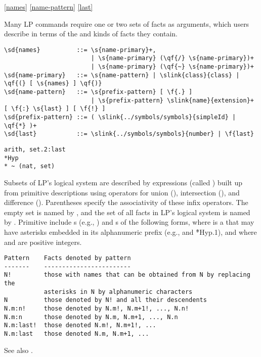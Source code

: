 \ref{names}
\ref{name-pattern}
\ref{last}

Many LP commands require one or two sets of facts as arguments, which users
describe in terms of the  and kinds of facts they contain.

\begin{verbatim}
\sd{names}          ::= \s{name-primary}+,
                        | \s{name-primary} (\qf{/} \s{name-primary})+
                        | \s{name-primary} (\qf{~} \s{name-primary})+
\sd{name-primary}   ::= \s{name-pattern} | \slink{class}{class} | \qf{(} [ \s{names} ] \qf{)}
\sd{name-pattern}   ::= \s{prefix-pattern} [ \f{.} ] 
                        | \s{prefix-pattern} \slink{name}{extension}+ [ \f{:} \s{last} ] [ \f{!} ]
\sd{prefix-pattern} ::= ( \slink{../symbols/symbols}{simpleId} | \qf{*} )+
\sd{last}           ::= \slink{../symbols/symbols}{number} | \f{last}

\end{verbatim}

\begin{verbatim}
arith, set.2:last
*Hyp
* ~ (nat, set)
\end{verbatim}

Subsets of LP's logical system are described by expressions (called )
built up from primitive descriptions using operators for union (\qf{,}),
intersection (\qf{/}), and difference (\qf{~}).  Parentheses specify the
associativity of these infix operators.  The empty set is named by
\fq{()}, and the set of all facts in LP's logical system is named by \fq{*}.
\p
Primitive  include s (e.g., ) and
s of the following forms, where  is a
 that may have asterisks embedded in its alphanumeric prefix (e.g., 
\fq{*} and \f{*Hyp.1}), and where  and  are positive integers.
\begin{verbatim}
Pattern    Facts denoted by pattern
-------    ------------------------
N!         those with names that can be obtained from N by replacing the
           asterisks in N by alphanumeric characters
N          those denoted by N! and all their descendents
N.m:n!     those denoted by N.m!, N.m+1!, ..., N.n!
N.m:n      those denoted by N.m, N.m+1, ..., N.n
N.m:last!  those denoted N.m!, N.m+1!, ...
N.m:last   those denoted N.m, N.m+1, ...
\end{verbatim}
\p
See also .

